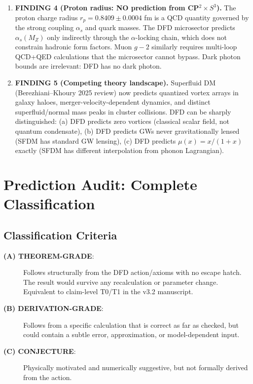 \documentclass[11pt]{article}
\begin{document}
\begin{tcolorbox}[colback=blue!5!white, colframe=blue!70!black,
  title=\textbf{TOP 5 FINDINGS (Ranked by Impact)}]
\begin{enumerate}
\item \textbf{FINDING 4 (Proton radius: NO prediction from CP$^2 \times S^3$).}
  The proton charge radius $r_p = 0.8409 \pm 0.0004$ fm is a QCD
  quantity governed by the strong coupling $\alpha_s$ and quark masses.
  The DFD microsector predicts $\alpha_s(M_Z)$ only indirectly through
  the $\alpha$-locking chain, which does not constrain hadronic form
  factors.  Muon $g-2$ similarly requires multi-loop QCD+QED
  calculations that the microsector cannot bypass.  Dark photon
  bounds are irrelevant: DFD has no dark photon.

\item \textbf{FINDING 5 (Competing theory landscape).}
  Superfluid DM (Berezhiani--Khoury 2025 review) now predicts
  quantized vortex arrays in galaxy haloes, merger-velocity-dependent
  dynamics, and distinct superfluid/normal mass peaks in cluster
  collisions.  DFD can be sharply distinguished:
  (a) DFD predicts zero vortices (classical scalar field, not quantum
  condensate), (b) DFD predicts GWs never gravitationally lensed
  (SFDM has standard GW lensing), (c) DFD predicts $\mu(x) = x/(1+x)$
  exactly (SFDM has different interpolation from phonon Lagrangian).
\end{enumerate}
\end{tcolorbox}

\section{Prediction Audit: Complete Classification}
\label{sec:audit}

\subsection{Classification Criteria}

\begin{description}
\item[\textbf{(A) THEOREM-GRADE}:] Follows structurally from the DFD
  action/axioms with no escape hatch.  The result would survive
  any recalculation or parameter change.  Equivalent to claim-level T0/T1
  in the v3.2 manuscript.

\item[\textbf{(B) DERIVATION-GRADE}:] Follows from a specific
  calculation that is correct as far as checked, but could contain
  a subtle error, approximation, or model-dependent input.

\item[\textbf{(C) CONJECTURE}:] Physically motivated and numerically
  suggestive, but not formally derived from the action.
\end{description}
\end{document}
